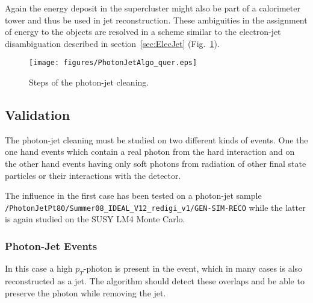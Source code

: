 \documentclass{cmspaper}
\begin{document}
Again the energy deposit in the supercluster might also be part of a
calorimeter tower and thus be used in jet reconstruction. These ambiguities in
the assignment of energy to the objects are resolved in a scheme similar to the
electron-jet disambiguation described in section~\ref{sec:ElecJet}
(Fig.~\ref{fig:PJCleaning}).


\begin{figure}[hbt]
\begin{center}
\texttt{[image: figures/PhotonJetAlgo\_quer.eps]}
\caption{Steps of the photon-jet cleaning.}
\label{fig:PJCleaning}
\end{center}
\end{figure}

\subsection{Validation}
The photon-jet cleaning must be studied on two different kinds of
events. One the one hand events which contain a real photon from the hard
interaction and on the other hand events having only soft photons from
radiation of other final state particles or their interactions with the detector.

The influence in the first case has been tested on a photon-jet sample
\newline\texttt{/PhotonJetPt80/Summer08\_IDEAL\_V12\_redigi\_v1/GEN-SIM-RECO} while
the latter is again studied on the SUSY LM4 Monte Carlo.

\subsubsection{Photon-Jet Events}
In this case a high $p_T$-photon is present in the event, which in many cases
is also reconstructed as a jet. The algorithm should detect these overlaps and
be able to preserve the photon while removing the jet.
\end{document}
